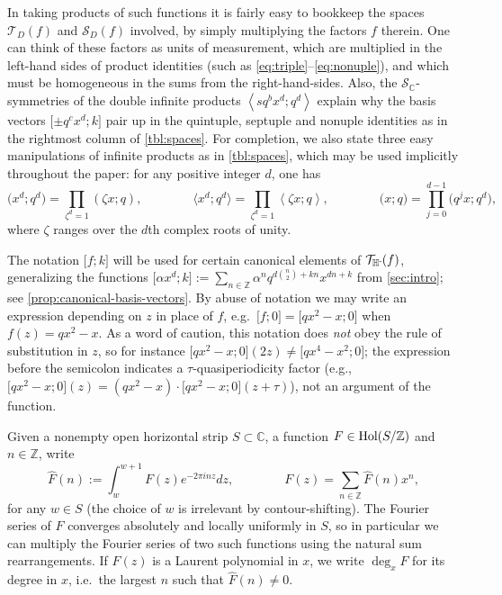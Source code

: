 \documentclass[reqno,11pt]{amsart}
\theoremstyle{definition}
\theoremstyle{remark}
\numberwithin{equation}{section}
\newcommand{\Z}{\mathbb{Z}}
\newcommand{\C}{\mathbb{C}}
\newcommand{\Hminus}{{\mathbb{H}^{\textnormal{-}\hspace{-0.03cm}}}}
\newcommand{\mT}{\mathcal{T}}
\newcommand{\mS}{\mathcal{S}}
\newcommand{\Hol}{\textnormal{Hol}}
\newcommand{\la}{\left\langle}
\newcommand{\ra}{\right\rangle}
\newcommand{\vect}[2]{\big[{#1};{#2}\big]}
\renewcommand{\hat}{\widehat}
\begin{document}
In taking products of such functions it is fairly easy to bookkeep the spaces $\mT_D(f)$ and $\mS_D(f)$ involved, by simply multiplying the factors $f$ therein.
One can think of these factors as units of measurement, which are multiplied in the left-hand sides of product identities (such as \cref{eq:triple}--\cref{eq:nonuple}), and which must be homogeneous in the sums from the right-hand-sides. Also, the $\mS_\C$-symmetries of the double infinite products $\la sq^b x^d; q^d \ra$ explain why the basis vectors $\vect{\pm q^c x^d}{k}$ pair up in the quintuple, septuple and nonuple identities as in the rightmost column of \cref{tbl:spaces}. For completion, we also state three easy manipulations of infinite products as in \cref{tbl:spaces}, which may be used implicitly throughout the paper: for any positive integer $d$, one has
\[
    \big(x^d; q^d\big) 
    =
    \prod_{\zeta^d = 1} \left(\zeta x; q\right),
    \qquad\qquad 
    \big\langle x^d; q^d\big\rangle 
    =
    \prod_{\zeta^d = 1} \la \zeta x; q\ra,
    \qquad\qquad 
    \big( x; q \big)
    =
    \prod_{j=0}^{d-1} 
    \big(q^j x; q^d \big)
    ,
\]
where $\zeta$ ranges over the $d$th complex roots of unity.

The notation $\vect{f}{k}$ will be used for certain canonical elements of $\mT_\Hminus(f)$, generalizing the functions $\vect{\alpha x^d}{k} := \sum_{n \in \Z} \alpha^n q^{d\binom{n}{2} + kn} x^{dn+k}$ from \cref{sec:intro}; see \cref{prop:canonical-basis-vectors}. By abuse of notation we may write an expression depending on $z$ in place of $f$, e.g.\ $\vect{f}{0} = \vect{qx^2-x}{0}$ when $f(z) = qx^2 - x$. As a word of caution, this notation does \emph{not} obey the rule of substitution in $z$, so for instance $\vect{qx^2-x}{0}(2z) \neq \vect{qx^4-x^2}{0}$; the expression before the semicolon indicates a $\tau$-quasiperiodicity factor (e.g., $\vect{qx^2-x}{0}(z) = (qx^2-x) \cdot \vect{qx^2-x}{0}(z+\tau)$), not an argument of the function.

Given a nonempty open horizontal strip $S \subset \C$, a function $F \in \Hol(S/\Z)$ and $n \in \Z$, write
\[
    \hat{F}(n) := \int_w^{w+1} F(z) e^{-2\pi i n z} dz,
    \qquad\qquad 
    F(z) = \sum_{n \in \Z} \hat{F}(n) x^n,
\] 
for any $w \in S$ (the choice of $w$ is irrelevant by contour-shifting). The Fourier series of $F$ converges absolutely and locally uniformly in $S$, so in particular we can multiply the Fourier series of two such functions using the natural sum rearrangements. If $F(z)$ is a Laurent polynomial in $x$, we write $\deg_x F$ for its degree in $x$, i.e.\ the largest $n$ such that $\hat{F}(n) \neq 0$. 
\end{document}

